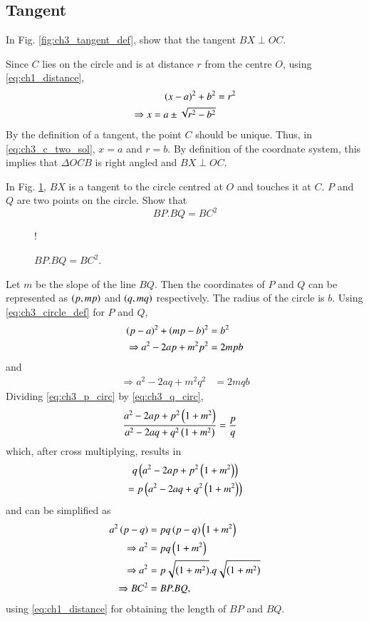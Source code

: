 \subsection{Tangent}
\begin{problem}
In Fig. \ref{fig:ch3_tangent_def}, show that the tangent $BX \perp OC$. 
\end{problem}
\proof Since $C$ lies on the circle and is at distance $r$ from the centre $O$, using \eqref{eq:ch1_distance},
%
\begin{align}
\left(x-a\right)^2 + b^2 &= r^2
\\
\Rightarrow x = a \pm \sqrt{r^2-b^2}
\label{eq:ch3_c_two_sol}
\end{align}
%
By the definition of a tangent, the point $C$ should be unique.  Thus, in \eqref{eq:ch3_c_two_sol}, $x = a$ and $r = b$. By definition of the coordnate system, this implies that $\Delta OCB$ is right angled and $BX \perp OC$.
\begin{problem}
In Fig. \ref{fig:ch3_tangent_intercept}, $BX$ is a tangent to the circle centred at $O$ and touches it at $C$.  $P$ and $Q$ are two points on the circle.  Show that
\begin{equation}
\label{eq:ch3_tangent_intercept}
BP.BQ = BC^2
\end{equation}
\end{problem}
%
\begin{figure}[!h]
\centering
\resizebox {\columnwidth} {!} {

}
\caption{$BP.BQ = BC^2$.}
\label{fig:ch3_tangent_intercept}
\end{figure}
%

\proof Let $m$ be the slope of the line $BQ$.  Then the coordinates of $P$ and $Q$ can be represented as $\left(p,mp\right)$ and $\left(q,mq\right)$ respectively. The radius of the circle is $b$.  Using \eqref{eq:ch3_circle_def} for $P$ and $Q$, 
%
\begin{align}
\left(p-a\right)^2 + \left(mp-b\right)^2 &= b^2
\\
\Rightarrow a^2 -2ap + m^2p^2 &= 2mpb
\label{eq:ch3_p_circ}
\end{align}
and
\begin{align}
\Rightarrow a^2 -2aq + m^2q^2 &= 2mqb
\label{eq:ch3_q_circ}
\end{align}
%
Dividing \eqref{eq:ch3_p_circ} by \eqref{eq:ch3_q_circ},
\begin{align}
\frac{a^2 -2ap + p^2\left(1+m^2\right)}{a^2 -2aq + q^2\left(1+m^2\right)} &= \frac{p}{q}
\end{align}
which, after cross multiplying, results in
\begin{multline}
q\left(a^2 -2ap + p^2\left(1+m^2\right)\right) 
\\
= p \left(a^2 -2aq + q^2\left(1+m^2\right)\right)
\end{multline}
and can be simplified as
\begin{align}
a^2\left(p-q\right)  &= pq\left(p-q\right)\left(1+m^2\right) 
\\
\Rightarrow
a^2  &= pq\left(1+m^2\right) 
\\
\Rightarrow a^2 &=  p\sqrt{\left(1+m^2\right)}.q\sqrt{\left(1+m^2\right)}
\\
\Rightarrow BC^2 &= BP.BQ,
\end{align}
using \eqref{eq:ch1_distance} for obtaining the length of $BP$ and $BQ$.
